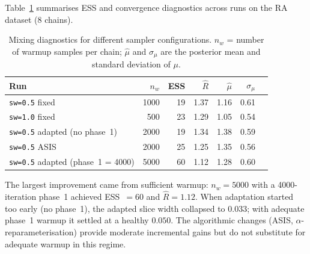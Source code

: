 \documentclass[11pt,a4paper]{article}
\begin{document}
Table~\ref{tab:results} summarises ESS and convergence diagnostics across runs on the RA dataset (8 chains).

\begin{table}[h]
\centering
\caption{Mixing diagnostics for different sampler configurations. $n_w$ = number of warmup samples per chain; $\hat\mu$ and $\sigma_\mu$ are the posterior mean and standard deviation of $\mu$.}
\label{tab:results}
\begin{tabular}{lrrrrrr}
\toprule
Run & $n_w$ & ESS & $\hat{R}$ & $\hat\mu$ & $\sigma_\mu$ \\
\midrule
\texttt{sw=0.5} fixed            & 1000 & 19 & 1.37 & 1.16 & 0.61 \\
\texttt{sw=1.0} fixed            & 500  & 23 & 1.29 & 1.05 & 0.54 \\
\texttt{sw=0.5} adapted (no phase~1) & 2000 & 19 & 1.34 & 1.38 & 0.59 \\
\texttt{sw=0.5} ASIS             & 2000 & 25 & 1.25 & 1.35 & 0.56 \\
\texttt{sw=0.5} adapted (phase~1 = 4000) & 5000 & 60 & 1.12 & 1.28 & 0.60 \\
\bottomrule
\end{tabular}
\end{table}

The largest improvement came from sufficient warmup: $n_w = 5000$ with a 4000-iteration phase~1 achieved ESS~$= 60$ and $\hat{R} = 1.12$. When adaptation started too early (no phase~1), the adapted slice width collapsed to $0.033$; with adequate phase~1 warmup it settled at a healthy $0.050$. The algorithmic changes (ASIS, $\alpha$-reparameterisation) provide moderate incremental gains but do not substitute for adequate warmup in this regime.
\end{document}
